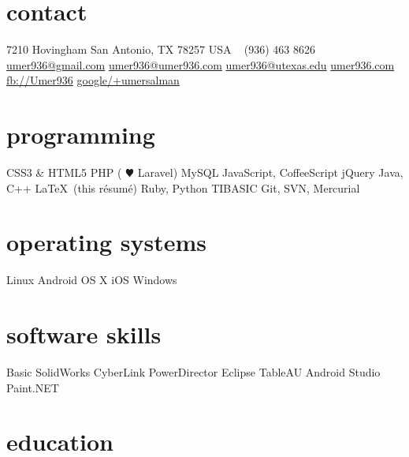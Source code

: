 \documentclass[print]{friggeri-cv} %
\begin{document}


\begin{aside} %
	\section{contact}
	7210 Hovingham 
	San Antonio, TX 78257
	USA 
	~
	(936) 463 8626
	~
	\href{mailto:umer936@gmail.com}{umer936@gmail.com}
	\href{mailto:umer936@umer936.com}{umer936@umer936.com}
	\href{mailto:umer936@utexas.edu}{umer936@utexas.edu}
	\href{http://umer936.com}{umer936.com}
	\href{http://facebook.com/Umer936}{fb://Umer936}
	\href{http://google.com/+umersalman}{google/+umersalman}
	~ 
	\section{programming}
	CSS3 \& HTML5 
	PHP ({\color{red} $\varheartsuit$} Laravel)
	MySQL
	JavaScript, CoffeeScript
	jQuery
	Java, C++
	\LaTeX \ (this r\'esum\'e)
	Ruby, Python
	TIBASIC
	Git, SVN, Mercurial
	~
	\section{operating systems}
	Linux
	Android
	OS X
	iOS
	Windows
	~ 
	\section{software skills}
	Basic SolidWorks
	CyberLink PowerDirector
	Eclipse
	TableAU
	Android Studio
	Paint.NET
\end{aside}


\section{education}
\end{document}
